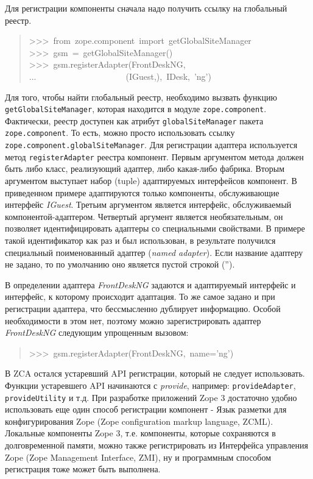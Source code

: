\documentclass[14pt,a4paper,openany,twoside,final]{extbook}
\providecommand*{\DUroletitlereference}[1]{\textsl{#1}}
\begin{document}
Для регистрации компоненты сначала надо получить ссылку на глобальный
реестр.

\begin{quote}{\ttfamily \raggedright \noindent
>{}>{}>~from~zope.component~import~getGlobalSiteManager\\
>{}>{}>~gsm~=~getGlobalSiteManager()\\
>{}>{}>~gsm.registerAdapter(FrontDeskNG,\\
...~~~~~~~~~~~~~~~~~~~~~(IGuest,),~IDesk,~'ng')
}
\end{quote}

Для того, чтобы найти глобальный реестр, необходимо вызвать функцию
\texttt{getGlobalSiteManager}, которая находится в модуле
\texttt{zope.component}.  Фактически, реестр доступен как атрибут
\texttt{globalSiteManager} пакета \texttt{zope.component}.  То есть, можно
просто использовать ссылку \texttt{zope.component.globalSiteManager}.  Для
регистрации адаптера используется метод \texttt{registerAdapter} реестра
компонент.  Первым аргументом метода должен быть либо класс,
реализующий адаптер, либо какая-либо фабрика.  Вторым аргументом
выступает набор (tuple) адаптируемых интерфейсов компонент.  В
приведенном примере адаптируются только компоненты, обслуживающие
интерфейс \DUroletitlereference{IGuest}.  Третьим аргументом является интерфейс,
обслуживаемый компонентой-адаптером.  Четвертый аргумент является
необязательным, он позволяет идентифицировать адаптеры со специальными
свойствами.  В примере такой идентификатор как раз и был использован,
в результате получился специальный поименованный адаптер (\DUroletitlereference{named
adapter}).  Если название адаптеру не задано, то по умолчанию оно является
пустой строкой ('').

В определении адаптера \DUroletitlereference{FrontDeskNG} задаются и адаптируемый интерфейс
и интерфейс, к которому происходит адаптация.  То же самое задано и
при регистрации адаптера, что бессмысленно дублирует информацию.
Особой необходимости в этом нет, поэтому можно зарегистрировать
адаптер \DUroletitlereference{FrontDeskNG} следующим упрощенным вызовом:

\begin{quote}{\ttfamily \raggedright \noindent
>{}>{}>~gsm.registerAdapter(FrontDeskNG,~name='ng')
}
\end{quote}

В ZCA остался устаревший API регистрации, который не следует
использовать.  Функции устаревшего API начинаются с \DUroletitlereference{provide},
например: \texttt{provideAdapter}, \texttt{provideUtility} и т.д.  При
разработке приложений Zope 3 достаточно удобно использовать еще один
способ регистрации компонент - Язык разметки для конфигурирования Zope
(Zope configuration markup language, ZCML).  Локальные компоненты Zope
3, т.е. компоненты, которые сохраняются в долговременной памяти, можно
также регистрировать из Интерфейса управления Zope (Zope Management
Interface, ZMI), ну и программным способом регистрация тоже может быть
выполнена.
\end{document}
